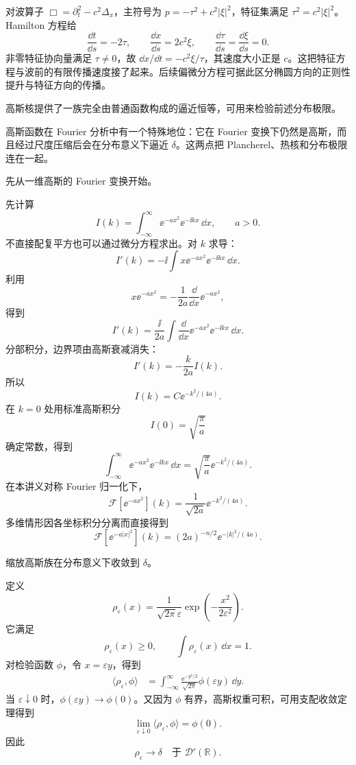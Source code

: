 对波算子 $\Box=\partial_t^2-c^2\Delta_x$，主符号为 $p=-\tau^2+c^2|\xi|^2$，特征集满足 $\tau^2=c^2|\xi|^2$。Hamilton 方程给
\[
\frac{\dd t}{\dd s}=-2\tau,
\qquad\frac{\dd x}{\dd s}=2c^2\xi,
\qquad\frac{\dd\tau}{\dd s}=\frac{\dd\xi}{\dd s}=0.
\]
非零特征协向量满足 $\tau\ne0$，故 $\dd x/\dd t=-c^2\xi/\tau$，其速度大小正是 $c$。这把特征方程与波前的有限传播速度接了起来。后续偏微分方程可据此区分椭圆方向的正则性提升与特征方向的传播。


高斯核提供了一族完全由普通函数构成的逼近恒等，可用来检验前述分布极限。

高斯函数在 Fourier 分析中有一个特殊地位：它在 Fourier 变换下仍然是高斯，而且经过尺度压缩后会在分布意义下逼近 $\delta$。这两点把 Plancherel、热核和分布极限连在一起。

先从一维高斯的 Fourier 变换开始。

先计算
\[
I(k)=\int_{-\infty}^{\infty}\ee^{-a x^2}\ee^{-\ii kx}\,\dd x,
\qquad a>0.
\]
不直接配复平方也可以通过微分方程求出。对 $k$ 求导：
\[
I'(k)
=-\ii\int x \ee^{-a x^2}\ee^{-\ii kx}\,\dd x.
\]
利用
\[
x \ee^{-a x^2}
=-\frac1{2a}\frac{\dd}{\dd x}\ee^{-a x^2},
\]
得到
\[
I'(k)
=\frac{\ii}{2a}
\int\frac{\dd}{\dd x}\ee^{-a x^2}\ee^{-\ii kx}\,\dd x.
\]
分部积分，边界项由高斯衰减消失：
\[
I'(k)
=-\frac{k}{2a}I(k).
\]
所以
\[
I(k)=C \ee^{-k^2/(4a)}.
\]
在 $k=0$ 处用标准高斯积分
\[
I(0)=\sqrt{\frac\pi a}
\]
确定常数，得到
\[
\boxed{
\int_{-\infty}^{\infty}\ee^{-a x^2}\ee^{-\ii kx}\,\dd x
=\sqrt{\frac\pi a}
\ee^{-k^2/(4a)}
}.
\]
在本讲义对称 Fourier 归一化下，
\begin{equation}
\boxed{
\mathcal F[\ee^{-a x^2}](k)
=\frac1{\sqrt{2a}}\ee^{-k^2/(4a)}
}.
\label{eq:gaussian-fourier}
\end{equation}
多维情形因各坐标积分分离而直接得到
\[
\mathcal F[\ee^{-a|x|^2}](k)
=(2a)^{-n/2}\ee^{-|k|^2/(4a)}.
\]

缩放高斯族在分布意义下收敛到 $\delta$。

定义
\[
\rho_\varepsilon(x)
=\frac1{\sqrt{2\pi}\varepsilon}
\exp\!\left(-\frac{x^2}{2\varepsilon^2}\right).
\]
它满足
\[
\rho_\varepsilon(x)\ge0,
\qquad
\int\rho_\varepsilon(x)\,\dd x=1.
\]
对检验函数 $\phi$，令 $x=\varepsilon y$，得到
\[
\begin{aligned}
\langle\rho_\varepsilon,\phi\rangle
&=\int_{-\infty}^{\infty}
\frac{\ee^{-y^2/2}}{\sqrt{2\pi}}
\phi(\varepsilon y)\,\dd y.
\end{aligned}
\]
当 $\varepsilon\downarrow0$ 时，$\phi(\varepsilon y)\to\phi(0)$。又因为 $\phi$ 有界，高斯权重可积，可用支配收敛定理得到
\[
\lim_{\varepsilon\downarrow0}
\langle\rho_\varepsilon,\phi\rangle
=\phi(0).
\]
因此
\begin{equation*}\boxed{
\rho_\varepsilon\longrightarrow\delta
\quad\text{于 }\mathcal D'(\mathbb R)
}.\end{equation*}

